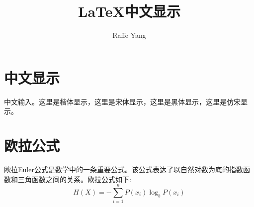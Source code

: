 \documentclass[UTF8]{article}
\author{Raffe Yang}
\title{\LaTeX 中文显示}
\begin{document}
	\maketitle
\section{中文显示}
	中文输入。{\kaishu 这里是楷体显示}，{\songti 这里是宋体显示}，{\heiti 这里是黑体显示}，{\fangsong 这里是仿宋显示}。
\section{欧拉公式}
欧拉Euler公式是数学中的一条重要公式。该公式表达了以自然对数为底的指数函数和三角函数之间的关系。欧拉公式如下:
\[
H(X) = -\sum_{i=1}^{n} P(x_i) \log_b P(x_i)
\]
\end{document}
